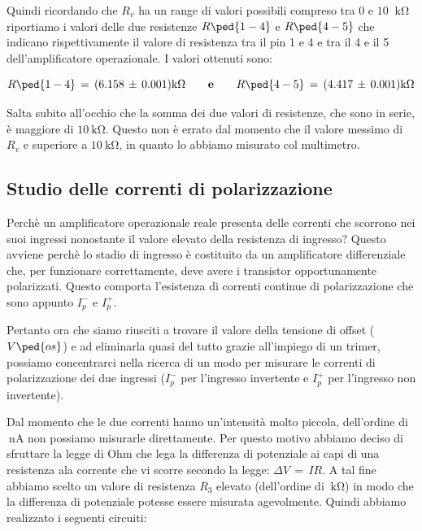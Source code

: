 Quindi ricordando che $R_v$ ha un range di valori possibili compreso tra $0$ e $10$ $\SI{}{\kilo\ohm}$ riportiamo i valori delle due resistenze $R\ped{1-4}$ e $R\ped{4-5}$ che indicano rispettivamente il valore di resistenza tra il pin 1 e 4  e tra il 4 e il 5 dell'amplificatore operazionale. I valori ottenuti sono:

\begin{equation}
	R\ped{1-4}\,=\,(6.158\,\pm\,0.001)\SI{}{\kilo\ohm} \qquad \textbf{e} \qquad R\ped{4-5}\,=\,(4.417\,\pm\,0.001)\SI{}{\kilo\ohm}
\end{equation}

Salta subito all'occhio che la somma dei due valori di resistenze, che sono in serie, è maggiore di $\SI{10}{\kilo\ohm}$. Questo non è errato dal momento che il valore messimo di $R_v$ e superiore a $\SI{10}{\kilo\ohm}$, in quanto lo abbiamo misurato col multimetro.

\subsection*{Studio delle correnti di polarizzazione}

Perchè un amplificatore operazionale reale presenta delle correnti che scorrono nei suoi ingressi nonostante il valore elevato della resistenza di ingresso? Questo avviene perchè lo stadio di ingresso è costituito da un amplificatore differenziale che, per funzionare correttamente, deve avere i transistor opportunamente polarizzati. Questo comporta l'esistenza di correnti continue di polarizzazione che sono appunto $I_{p}^-$ e $I_{p}^+$.

Pertanto ora che siamo riusciti a trovare il valore della tensione di offset ($V\ped{os}$) e ad eliminarla quasi del tutto grazie all'impiego di un trimer, possiamo concentrarci nella ricerca di un modo per misurare le correnti di polarizzazione dei due ingressi ($I_{p}^-$ per l'ingresso invertente e $I_{p}^+$ per l'ingresso non invertente).

Dal momento che le due correnti hanno un'intensità molto piccola, dell'ordine di $\SI{}{\nano\ampere}$ non possiamo misurarle direttamente. Per questo motivo abbiamo deciso di sfruttare la legge di Ohm che lega la differenza di potenziale ai capi di una resistenza ala corrente che vi scorre secondo la legge: $\Delta V\,=\,IR$. A tal fine abbiamo scelto un valore di resistenza $R_3$ elevato (dell'ordine di $\SI{}{\kilo\ohm}$) in modo che la differenza di potenziale potesse essere misurata agevolmente. Quindi abbiamo realizzato i seguenti circuiti:

